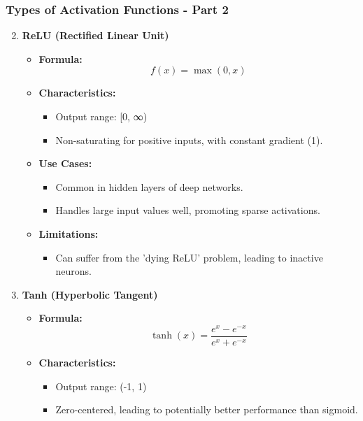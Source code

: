 \documentclass{beamer}
\begin{document}
\begin{frame}[fragile]
    \frametitle{Types of Activation Functions - Part 2}
    \begin{enumerate}
        \setcounter{enumi}{1} %
        \item \textbf{ReLU (Rectified Linear Unit)}
            \begin{itemize}
                \item \textbf{Formula:}
                \[
                f(x) = \max(0, x)
                \]
                \item \textbf{Characteristics:}
                    \begin{itemize}
                        \item Output range: [0, ∞)
                        \item Non-saturating for positive inputs, with constant gradient (1).
                    \end{itemize}
                \item \textbf{Use Cases:}
                    \begin{itemize}
                        \item Common in hidden layers of deep networks.
                        \item Handles large input values well, promoting sparse activations.
                    \end{itemize}
                \item \textbf{Limitations:}
                    \begin{itemize}
                        \item Can suffer from the 'dying ReLU' problem, leading to inactive neurons.
                    \end{itemize}
            \end{itemize}
        \item \textbf{Tanh (Hyperbolic Tangent)}
            \begin{itemize}
                \item \textbf{Formula:}
                \[
                \tanh(x) = \frac{e^{x} - e^{-x}}{e^{x} + e^{-x}}
                \]
                \item \textbf{Characteristics:}
                    \begin{itemize}
                        \item Output range: (-1, 1)
                        \item Zero-centered, leading to potentially better performance than sigmoid.

\end{itemize}
\end{itemize}
\end{enumerate}
\end{frame}
\end{document}
